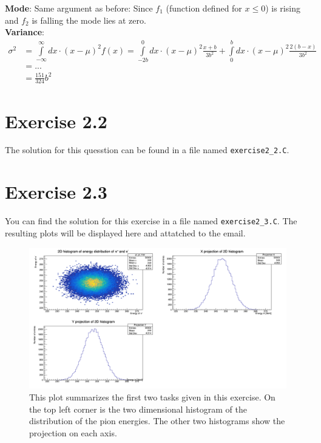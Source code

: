\documentclass[10pt]{article}
\newenvironment{myfont}{\fontfamily{put}\selectfont}{\par}
\begin{document}
\begin{myfont}
\begin{itemize}
  \noindent \textbf{Mode}: Same argument as before: Since $f_{1}$ (function defined for $x \leq 0$) is rising and $f_{2}$ is falling the mode lies at zero. \\

  \noindent \textbf{Variance}: 
  \begin{align*}
  \sigma^{2} & = \int\limits_{-\infty}^{\infty}dx \cdot (x - \mu)^{2}f(x) = \int\limits_{-2b}^{0}dx \cdot (x - \mu)^{2}\frac{x+b}{3b^{2}} + \int\limits_{0}^{b}dx \cdot (x - \mu)^{2}\frac{2(b-x)}{3b^{2}} \\
             & = ... \\
             & = \frac{151}{324}b^{2}
  \end{align*}
\end{itemize}

\section*{Exercise 2.2}

The solution for this quesstion can be found in a file named \texttt{exercise2\_2.C}.


\section*{Exercise 2.3}

You can find the solution for this exercise in a file named \texttt{exercise2\_3.C}.
The resulting plots will be displayed here and attatched to the email.

\begin{figure}[H]
\centering
\caption{This plot summarizes the first two tasks given in this exercise.
On the top left corner is the two dimensional histogram of the distribution of the pion energies.
The other two histograms show the projection on each axis.}
\includegraphics[width = \textwidth]{./canvas.png}
\end{figure}



\end{myfont}
\end{document}
